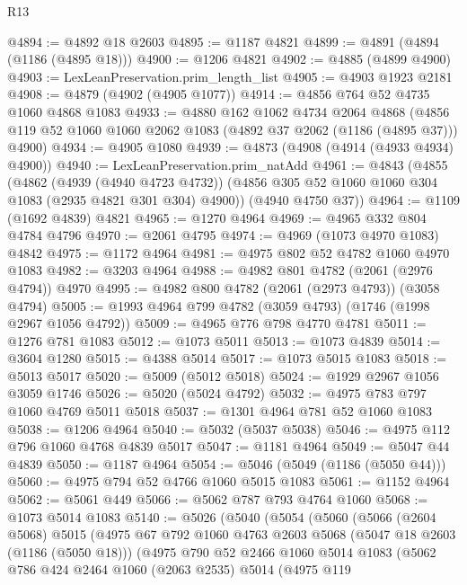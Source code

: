 \begin{lexlean}{R13}
\begin{coremodule}
@4894 := @4892 @18 @2603
@4895 := @1187 @4821
@4899 := @4891 (@4894 (@1186 (@4895 @18)))
@4900 := @1206 @4821
@4902 := @4885 (@4899 @4900)
@4903 := LexLeanPreservation.prim_length_list
@4905 := @4903 @1923 @2181
@4908 := @4879 (@4902 (@4905 @1077))
@4914 := @4856 @764 @52 @4735 @1060 @4868 @1083
@4933 := @4880
    @162
    @1062
    @4734
    @2064
    @4868
    (@4856 @119 @52 @1060 @1060 @2062 @1083 (@4892 @37 @2062 (@1186 (@4895 @37))) @4900)
@4934 := @4905 @1080
@4939 := @4873 (@4908 (@4914 (@4933 @4934) @4900))
@4940 := LexLeanPreservation.prim_natAdd
@4961 := @4843
    (@4855
      (@4862
        (@4939 (@4940 @4723 @4732))
        (@4856 @305 @52 @1060 @1060 @304 @1083 (@2935 @4821 @301 @304) @4900))
      (@4940 @4750 @37))
@4964 := @1109 (@1692 @4839) @4821
@4965 := @1270 @4964
@4969 := @4965 @332 @804 @4784 @4796
@4970 := @2061 @4795
@4974 := @4969 (@1073 @4970 @1083) @4842
@4975 := @1172 @4964
@4981 := @4975 @802 @52 @4782 @1060 @4970 @1083
@4982 := @3203 @4964
@4988 := @4982 @801 @4782 (@2061 (@2976 @4794)) @4970
@4995 := @4982 @800 @4782 (@2061 (@2973 @4793)) (@3058 @4794)
@5005 := @1993 @4964 @799 @4782 (@3059 @4793) (@1746 (@1998 @2967 @1056 @4792))
@5009 := @4965 @776 @798 @4770 @4781
@5011 := @1276 @781 @1083
@5012 := @1073 @5011
@5013 := @1073 @4839
@5014 := @3604 @1280
@5015 := @4388 @5014
@5017 := @1073 @5015 @1083
@5018 := @5013 @5017
@5020 := @5009 (@5012 @5018)
@5024 := @1929 @2967 @1056 @3059 @1746
@5026 := @5020 (@5024 @4792)
@5032 := @4975 @783 @797 @1060 @4769 @5011 @5018
@5037 := @1301 @4964 @781 @52 @1060 @1083
@5038 := @1206 @4964
@5040 := @5032 (@5037 @5038)
@5046 := @4975 @112 @796 @1060 @4768 @4839 @5017
@5047 := @1181 @4964
@5049 := @5047 @44 @4839
@5050 := @1187 @4964
@5054 := @5046 (@5049 (@1186 (@5050 @44)))
@5060 := @4975 @794 @52 @4766 @1060 @5015 @1083
@5061 := @1152 @4964
@5062 := @5061 @449
@5066 := @5062 @787 @793 @4764 @1060
@5068 := @1073 @5014 @1083
@5140 := @5026
    (@5040
      (@5054
        (@5060
          (@5066
            (@2604 @5068)
            @5015
            (@4975
              @67
              @792
              @1060
              @4763
              @2603
              @5068
              (@5047 @18 @2603 (@1186 (@5050 @18)))
              (@4975
                @790
                @52
                @2466
                @1060
                @5014
                @1083
                (@5062
                  @786
                  @424
                  @2464
                  @1060
                  (@2063 @2535)
                  @5014
                  (@4975
                    @119

\end{coremodule}
\end{lexlean}

